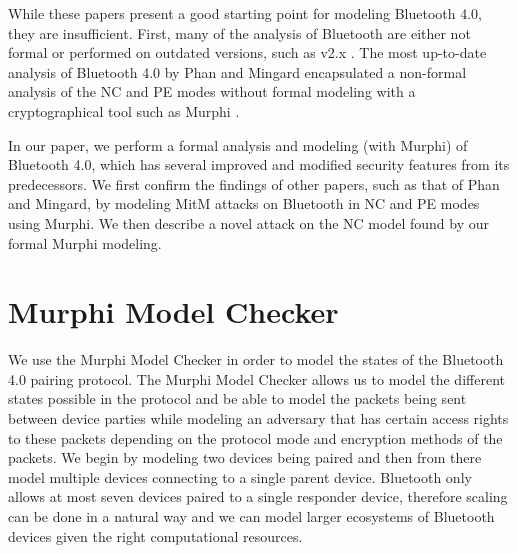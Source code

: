 \documentclass{acm_proc_article-sp}
\begin{document}
While these papers present a good starting point for modeling Bluetooth 4.0, they are insufficient. First, many of the analysis of Bluetooth are either not formal or performed on outdated versions, such as v2.x \cite{manish,dunning,lindell1,lindell2}. The most up-to-date analysis of Bluetooth 4.0 by Phan and Mingard encapsulated a non-formal analysis of the NC and PE modes without formal modeling with a cryptographical tool such as Murphi \cite{phan:mingard}.

In our paper, we perform a formal analysis and modeling (with Murphi) of Bluetooth 4.0, which has several improved and modified security features from its predecessors. We first confirm the findings of other papers, such as that of Phan and Mingard, by modeling MitM attacks on Bluetooth in NC and PE modes using Murphi. We then describe a novel attack on the NC model found by our formal Murphi modeling.

\section{Murphi Model Checker}
We use the Murphi Model Checker \cite{bau:mitchell} in order to model the states of the Bluetooth 4.0 pairing protocol. The Murphi Model Checker allows us to model the different states possible in the protocol and be able to model the packets being sent between device parties while modeling an adversary that has certain access rights to these packets depending on the protocol mode and encryption methods of the packets. We begin by modeling two devices being paired and then from there model multiple devices connecting to a single parent device. Bluetooth only allows at most seven devices paired to a single responder device, therefore scaling can be done in a natural way and we can model larger ecosystems of Bluetooth devices given the right computational resources.
\end{document}
